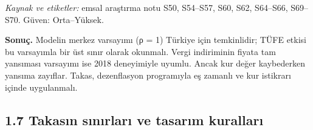 \endgroup

\emph{Kaynak ve etiketler:} \etiketV{} emsal araştırma notu S50, S54--S57, S60, S62, S64--S66, S69--S70. Güven: Orta--Yüksek.

\textbf{Sonuç.} Modelin merkez varsayımı (ρ = 1) Türkiye için temkinlidir; TÜFE etkisi bu varsayımla bir üst sınır olarak okunmalı. Vergi indiriminin fiyata tam yansıması varsayımı ise 2018 deneyimiyle uyumlu. Ancak kur değer kaybederken yansıma zayıflar. Takas, dezenflasyon programıyla eş zamanlı ve kur istikrarı içinde uygulanmalı.

\hypertarget{02a_politika_uzayi-17-takasux131n-sux131nux131rlarux131-ve-tasarux131m-kurallarux131}{%
\subsection{1.7 Takasın sınırları ve tasarım kuralları}\label{02a_politika_uzayi-17-takasux131n-sux131nux131rlarux131-ve-tasarux131m-kurallarux131}}

